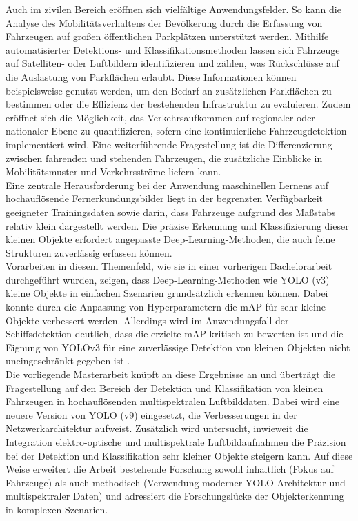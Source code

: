 Auch im zivilen Bereich eröffnen sich vielfältige Anwendungsfelder. So kann die Analyse des Mobilitätsverhaltens der Bevölkerung durch die Erfassung von Fahrzeugen auf großen öffentlichen Parkplätzen unterstützt werden. Mithilfe automatisierter Detektions- und Klassifikationsmethoden lassen sich Fahrzeuge auf Satelliten- oder Luftbildern identifizieren und zählen, was Rückschlüsse auf die Auslastung von Parkflächen erlaubt. Diese Informationen können beispielsweise genutzt werden, um den Bedarf an zusätzlichen Parkflächen zu bestimmen oder die Effizienz der bestehenden Infrastruktur zu evaluieren. Zudem eröffnet sich die Möglichkeit, das Verkehrsaufkommen auf regionaler oder nationaler Ebene zu quantifizieren, sofern eine kontinuierliche Fahrzeugdetektion implementiert wird. Eine weiterführende Fragestellung ist die Differenzierung zwischen fahrenden und stehenden Fahrzeugen, die zusätzliche Einblicke in Mobilitätsmuster und Verkehrsströme liefern kann. \\

Eine zentrale Herausforderung bei der Anwendung maschinellen Lernens auf hochauflösende Fernerkundungsbilder liegt in der begrenzten Verfügbarkeit geeigneter Trainingsdaten sowie darin, dass Fahrzeuge aufgrund des Maßstabs relativ klein dargestellt werden. Die präzise Erkennung und Klassifizierung dieser kleinen Objekte erfordert angepasste Deep-Learning-Methoden, die auch feine Strukturen zuverlässig erfassen können. \\

Vorarbeiten in diesem Themenfeld, wie sie in einer vorherigen Bachelorarbeit \cite{Balzer2022} durchgeführt wurden, zeigen, dass Deep-Learning-Methoden wie \acrfull{YOLO} (v3) kleine Objekte in einfachen Szenarien grundsätzlich erkennen können. Dabei konnte durch die Anpassung von Hyperparametern die \acrfull{mAP} für sehr kleine Objekte verbessert werden. Allerdings wird im Anwendungsfall der Schiffsdetektion deutlich, dass die erzielte mAP kritisch zu bewerten ist und die Eignung von YOLOv3 für eine zuverlässige Detektion von kleinen Objekten nicht uneingeschränkt gegeben ist \cite{Balzer2022}. \\

Die vorliegende Masterarbeit knüpft an diese Ergebnisse an und überträgt die Fragestellung auf den Bereich der Detektion und Klassifikation von kleinen Fahrzeugen in hochauflösenden multispektralen Luftbilddaten. Dabei wird eine neuere Version von \acrfull{YOLO} (v9) eingesetzt, die Verbesserungen in der Netzwerkarchitektur aufweist. Zusätzlich wird untersucht, inwieweit die Integration elektro-optische und multispektrale Luftbildaufnahmen  die Präzision bei der Detektion und Klassifikation sehr kleiner Objekte steigern kann. Auf diese Weise erweitert die Arbeit bestehende Forschung sowohl inhaltlich (Fokus auf Fahrzeuge) als auch methodisch (Verwendung moderner YOLO-Architektur und multispektraler Daten) und adressiert die Forschungslücke der Objekterkennung in komplexen Szenarien.


